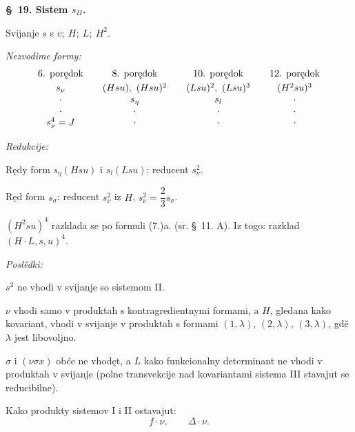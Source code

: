 \documentclass[11pt]{article}
\begin{document}
\begin{center}
\textbf{\S\ 19. \quad Sistem $s_{II}$.}
\end{center}

Svijanje $s$ s $v;\ H;\ L;\ H^2$.

\noindent\textit{Nezvodime formy:}
\[
\begin{array}{c@{\qquad}c@{\qquad}c@{\qquad}c}
\text{6. porędok} & \text{8. porędok} & \text{10. porędok} & \text{12. porędok}\\[0.3em]
s_{\nu} & (Hsu),\ (Hsu)^2 & (Lsu)^2,\ (Lsu)^3 & (H^2su)^3\\
\cdot & s_\eta & s_l & \cdot\\
\cdot & \cdot & \cdot & \cdot\\
s_{\nu}^4=J & \cdot & \cdot & \cdot
\end{array}
\]

\noindent\textit{Redukcije:}

Rędy form $s_\eta(Hsu)$ i $s_l(Lsu)$: reducent $s_{\nu}^2$.

Ręd form $s_\sigma$: reducent $s_{\nu}^2$ iz $H$, $s_{\nu}^2=\dfrac23s_\sigma$.

$(H^2su)^4$ razklada se po formuli (7.)a. (sr. \S\ 11. A). Iz togo: razklad $(H\cdot L,s,u)^4$.

\noindent\textit{Poslědki:}

$s^2$ ne vhodi v svijanje so sistemom II.

$\nu$ vhodi samo v produktah s kontragredientnymi formami, a $H$, gledana kako kovariant, vhodi v svijanje v produktah s formami $(1,\lambda)$, $(2,\lambda)$, $(3,\lambda)$, gdě $\lambda$ jest libovoljno.

$\sigma$ i $(\nu\sigma x)$ obće ne vhodęt, a $L$ kako funkcionalny determinant ne vhodi v produktah v svijanje (polne transvekcije nad kovariantami sistema III stavajut se reducibilne).

Kako produkty sistemov I i II ostavajut:
\[
f\cdot \nu,\qquad \Delta\cdot \nu.
\]
\end{document}
